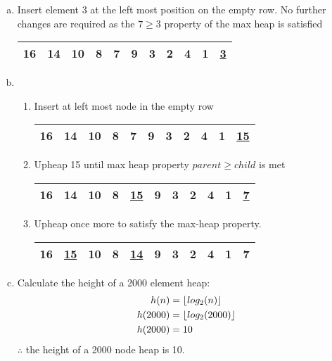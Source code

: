 \documentclass[fleqn, 12pt]{article}
\DeclarePairedDelimiter\floor{\lfloor}{\rfloor}
\begin{document}
\begin{enumerate}[a)]
\item Insert element 3 at the left most position on the empty row. No further changes are required as the $7\ge3$ property of the max heap is satisfied
    \begin{center}
        \begin{tabular}{|*{11}{c|}}
            \hline
            16 & 14 & 10 & 8 & 7 & 9 & 3 & 2 & 4 & 1 & \underline{3}\\
            \hline
        \end{tabular}
    \end{center}
    \newpage
\item
    \begin{enumerate}[Step 1:]
    \item Insert at left most node in the empty row
        \begin{center}
            \begin{tabular}{|*{11}{c|}}
                \hline
                16 & 14 & 10 & 8 & 7 & 9 & 3 & 2 & 4 & 1 & \underline{15}\\
                \hline
            \end{tabular}
        \end{center}
        

    \item Upheap 15 until max heap property $parent \ge child$ is met
        \begin{center}
            \begin{tabular}{|*{11}{c|}}
                \hline
                16 & 14 & 10 & 8 & \underline{15} & 9 & 3 & 2 & 4 & 1 & \underline{7}\\
                \hline
            \end{tabular}
        \end{center}
        
    \item Upheap once more to satisfy the max-heap property.
        \begin{center}
            \begin{tabular}{|*{11}{c|}}
                \hline
                16 & \underline{15} & 10 & 8 & \underline{14} & 9 & 3 & 2 & 4 & 1 & 7\\
                \hline
            \end{tabular}
        \end{center}
    \end{enumerate}

\item Calculate the height of a 2000 element heap:
    \begin{align*}
      h(n) &= \floor{log_2 (n)} \\
      h(2000) &= \floor{log_2 (2000)}\\
      h(2000) &= 10
    \end{align*}
    $\therefore$ the height of a 2000 node heap is 10.

\end{enumerate}
\end{document}
